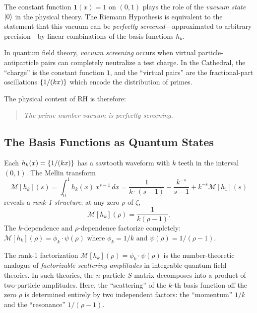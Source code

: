 \documentclass[11pt,a4paper]{article}
\begin{document}
\begin{principle}
The constant function $\mathbf{1}(x) = 1$ on $(0,1)$ plays the role of
the \emph{vacuum state} $| 0 \rangle$ in the physical theory. The Riemann
Hypothesis is equivalent to the statement that this vacuum can be
\emph{perfectly screened}---approximated to arbitrary precision---by
linear combinations of the basis functions $h_k$.
\end{principle}

In quantum field theory, \emph{vacuum screening} occurs when virtual
particle-antiparticle pairs can completely neutralize a test charge.
In the Cathedral, the ``charge'' is the constant function $1$, and the
``virtual pairs'' are the fractional-part oscillations $\{1/(kx)\}$
which encode the distribution of primes.

The physical content of RH is therefore:
\begin{quote}
\emph{The prime number vacuum is perfectly screening.}
\end{quote}

\subsection{The Basis Functions as Quantum States}

Each $h_k(x) = \{1/(kx)\}$ has a sawtooth waveform with $k$ teeth
in the interval $(0,1)$. The Mellin transform
\[
  \mathcal{M}[h_k](s) = \int_0^1 h_k(x) \, x^{s-1}\,dx = \frac{1}{k \cdot (s-1)}
  - \frac{k^{-s}}{s-1} + k^{-s}\mathcal{M}[h_1](s)
\]
reveals a \emph{rank-1 structure}: at any zero $\rho$ of $\zeta$,
\[
  \mathcal{M}[h_k](\rho) = \frac{1}{k(\rho - 1)}.
\]
The $k$-dependence and $\rho$-dependence factorize completely:
$\mathcal{M}[h_k](\rho) = \phi_k \cdot \psi(\rho)$ where
$\phi_k = 1/k$ and $\psi(\rho) = 1/(\rho-1)$.

\begin{correspondence}[Rank-1 = Factorizable Scattering]
The rank-1 factorization $\mathcal{M}[h_k](\rho) = \phi_k \cdot \psi(\rho)$
is the number-theoretic analogue of \emph{factorizable scattering amplitudes}
in integrable quantum field theories. In such theories, the $n$-particle
$S$-matrix decomposes into a product of two-particle amplitudes. Here,
the ``scattering'' of the $k$-th basis function off the zero $\rho$ is
determined entirely by two independent factors: the ``momentum'' $1/k$
and the ``resonance'' $1/(\rho-1)$.
\end{correspondence}
\end{document}
